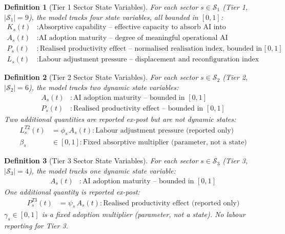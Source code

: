 \documentclass[11pt,a4paper]{article}
\newtheorem{definition}{Definition}
\begin{document}
\begin{definition}[Tier 1 Sector State Variables]
For each sector $s \in \mathcal{S}_1$ (Tier 1, $|\mathcal{S}_1| = 9$), the model tracks four state variables, all bounded in $[0,1]$:
\begin{align}
K_s(t) &: \text{Absorptive capability -- effective capacity to absorb AI into productive use} \\
A_s(t) &: \text{AI adoption maturity -- degree of meaningful operational AI deployment} \\
P_s(t) &: \text{Realised productivity effect -- normalised realisation index, bounded in $[0,1]$} \\
L_s(t) &: \text{Labour adjustment pressure -- displacement and reconfiguration index}
\end{align}
\end{definition}

\begin{definition}[Tier 2 Sector State Variables]
For each sector $s \in \mathcal{S}_2$ (Tier 2, $|\mathcal{S}_2| = 6$), the model tracks two dynamic state variables:
\begin{align}
A_s(t) &: \text{AI adoption maturity -- bounded in $[0,1]$} \\
P_s(t) &: \text{Realised productivity effect -- bounded in $[0,1]$}
\end{align}
Two additional quantities are reported ex-post but are not dynamic states:
\begin{align}
L_s^{T2}(t) &= \phi_s\, A_s(t) : \text{Labour adjustment pressure (reported only)} \\
\beta_s &\in [0,1] : \text{Fixed absorptive multiplier (parameter, not a state)}
\end{align}
\end{definition}

\begin{definition}[Tier 3 Sector State Variables]
For each sector $s \in \mathcal{S}_3$ (Tier 3, $|\mathcal{S}_3| = 4$), the model tracks one dynamic state variable:
\begin{align}
A_s(t) &: \text{AI adoption maturity -- bounded in $[0,1]$}
\end{align}
One additional quantity is reported ex-post:
\begin{align}
P_s^{T3}(t) &= \psi_s\, A_s(t) : \text{Realised productivity effect (reported only)}
\end{align}
$\gamma_s \in [0,1]$ is a fixed adoption multiplier (parameter, not a state). No labour reporting for Tier 3.
\end{definition}
\end{document}
